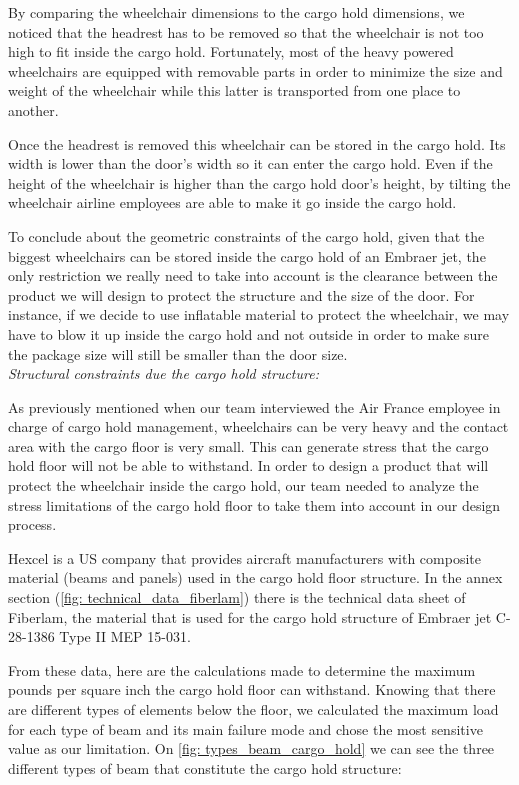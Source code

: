 By comparing the wheelchair dimensions to the cargo hold dimensions, we noticed that the headrest has to be removed so that the wheelchair is not too high to fit inside the cargo hold. Fortunately, most of the heavy powered wheelchairs are equipped with removable parts in order to minimize the size and weight of the wheelchair while this latter is transported from one place to another.

Once the headrest is removed this wheelchair can be stored in the cargo hold. Its width is lower than the door's width so it can enter the cargo hold. Even if the height of the wheelchair is higher than the cargo hold door's height, by tilting the wheelchair airline employees are able to make it go inside the cargo hold.

To conclude about the geometric constraints of the cargo hold, given that the biggest wheelchairs can be stored inside the cargo hold of an Embraer jet, the only restriction we really need to take into account is the clearance between the product we will design to protect the structure and the size of the door. For instance, if we decide to use inflatable material to protect the wheelchair, we may have to blow it up inside the cargo hold and not outside in order to make sure the package size will still be smaller than the door size.\\

\noindent\emph{Structural constraints due the cargo hold structure:}

As previously mentioned when our team interviewed the Air France employee in charge of cargo hold management, wheelchairs can be very heavy and the contact area with the cargo floor is very small. This can generate stress that the cargo hold floor will not be able to withstand. In order to design a product that will protect the wheelchair inside the cargo hold, our team needed to analyze the stress limitations of the cargo hold floor to take them into account in our design process.

Hexcel is a US company that provides aircraft manufacturers with composite material (beams and panels) used in the cargo hold floor structure. In the annex section (\ref{fig: technical_data_fiberlam}) there is the technical data sheet of Fiberlam, the material that is used for the cargo hold structure of Embraer jet C-28-1386 Type II MEP 15-031.

From these data, here are the calculations made to determine the maximum pounds per square inch the cargo hold floor can withstand. Knowing that there are different types of elements below the floor, we calculated the maximum load for each type of beam and its main failure mode and chose the most sensitive value as our limitation.
On \ref{fig: types_beam_cargo_hold} we can see the three different types of beam that constitute the cargo hold structure:

